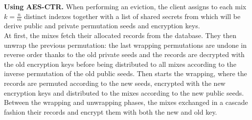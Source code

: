 \documentclass{llncs}
\begin{document}
\noindent\textbf{Using AES-CTR.}
When performing an eviction, the client assigns to each mix  $k=\frac{n}{m}$ distinct indexes together with a list of shared secrets from which will be derive public and private permutation seeds and encryption keys.\\
At first, the mixes fetch their allocated records from the database. They then unwrap the previous permutation: the last wrapping permutations are undone in reverse order thanks to the old private seeds and the records are decrypted with the old encryption keys before being distributed to all mixes according to the inverse permutation of the old public seeds. Then starts the wrapping, where the records are permuted according to the new seeds, encrypted with the new encryption keys and distributed to the mixes according to the new public seeds. Between the wrapping and unwrapping phases, the mixes exchanged in a cascade fashion their records and encrypt them with both the new and old key.\\
\iffalse
To find the ORAM index of a precise record, the client performs the index lookup function written in Algorithm.~\ref{alg:IAS}.
\fi
\iffalse
\end{document}
